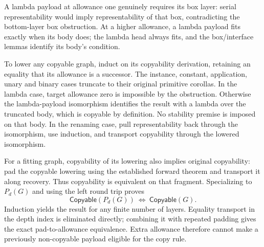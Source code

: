 


A lambda payload at allowance one genuinely requires its box layer: serial
representability would imply representability of that box, contradicting the
bottom-layer box obstruction. At a higher allowance, a lambda payload fits
exactly when its body does; the lambda head always fits, and the box/interface
lemmas identify its body's condition.

To lower any copyable graph, induct on its copyability derivation, retaining
an equality that its allowance is a successor. The instance, constant,
application, unary and binary cases truncate to their original primitive
corollas. In the lambda case, target allowance zero is impossible by the
obstruction. Otherwise the lambda-payload isomorphism identifies the result
with a lambda over the truncated body, which is copyable by definition.
No stability premise is imposed on that body. In the renaming case, pull
representability back through the isomorphism, use induction, and transport
copyability through the lowered isomorphism.




For a fitting graph, copyability of its lowering also implies original
copyability: pad the copyable lowering using the established forward theorem
and transport it along recovery. Thus copyability is equivalent on that
fragment. Specializing to $P_d(G)$ and using the left round trip proves
\[
 \mathsf{Copyable}(P_d(G))\ \Longleftrightarrow\ \mathsf{Copyable}(G).
\]
Induction yields the result for any finite number of layers. Equality transport
in the depth index is eliminated directly; combining it with repeated padding
gives the exact pad-to-allowance equivalence. Extra allowance therefore cannot
make a previously non-copyable payload eligible for the copy rule.



